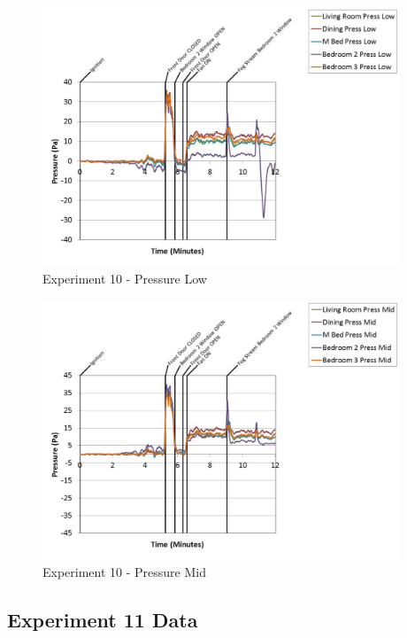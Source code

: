 \documentclass{article}
\begin{document}
\begin{appendices}
	\begin{figure}[h!]
		\centering
		\includegraphics[height=3.05in]{0_Images/Results_Charts/Exp_10_Charts/PressureLow.pdf}
		\caption{Experiment 10 - Pressure Low}
	\end{figure}
 
	\clearpage

	\begin{figure}[h!]
		\centering
		\includegraphics[height=3.05in]{0_Images/Results_Charts/Exp_10_Charts/PressureMid.pdf}
		\caption{Experiment 10 - Pressure Mid}
	\end{figure}
 

		\clearpage
\clearpage		\large
\subsection{Experiment 11 Data} \label{App:Exp11Results} 


\end{appendices}
\end{document}
